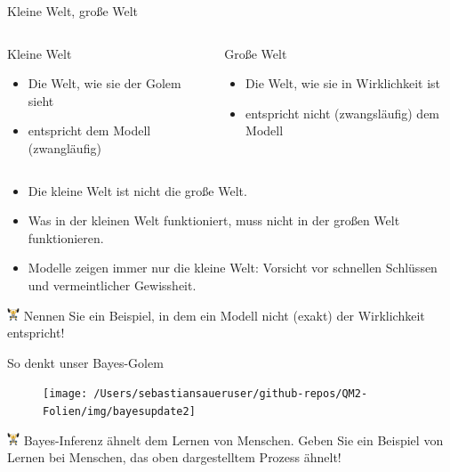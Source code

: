 \documentclass[
  ngerman,
  ignorenonframetext,
]{beamer}
\providecommand{\tightlist}{%
  \setlength{\itemsep}{0pt}\setlength{\parskip}{0pt}}
\begin{document}
\begin{frame}{Kleine Welt, große Welt}
\protect\hypertarget{kleine-welt-grouxdfe-welt-1}{}
\begin{columns}[T]
\begin{column}{0.5\textwidth}
\begin{block}{Kleine Welt}
\protect\hypertarget{kleine-welt}{}
\begin{itemize}
\tightlist
\item
  Die Welt, wie sie der Golem sieht
\item
  entspricht dem Modell (zwangläufig)
\end{itemize}
\end{block}
\end{column}

\begin{column}{0.5\textwidth}
\begin{block}{Große Welt}
\protect\hypertarget{grouxdfe-welt}{}
\begin{itemize}
\tightlist
\item
  Die Welt, wie sie in Wirklichkeit ist
\item
  entspricht nicht (zwangsläufig) dem Modell
\end{itemize}
\end{block}
\end{column}
\end{columns}

\begin{itemize}
\tightlist
\item
  Die kleine Welt ist nicht die große Welt.
\item
  Was in der kleinen Welt funktioniert, muss nicht in der großen Welt
  funktionieren.
\item
  Modelle zeigen immer nur die kleine Welt: Vorsicht vor schnellen
  Schlüssen und vermeintlicher Gewissheit.
\end{itemize}

\includegraphics[width=1em]{../img/weight.pdf} Nennen Sie ein Beispiel,
in dem ein Modell nicht (exakt) der Wirklichkeit entspricht!
\end{frame}

\begin{frame}{So denkt unser Bayes-Golem}
\protect\hypertarget{so-denkt-unser-bayes-golem}{}
\begin{figure}[H]
\texttt{[image: /Users/sebastiansaueruser/github-repos/QM2-Folien/img/bayesupdate2]} \end{figure}

\includegraphics[width=1em]{../img/weight.pdf} Bayes-Inferenz ähnelt dem
Lernen von Menschen. Geben Sie ein Beispiel von Lernen bei Menschen, das
oben dargestelltem Prozess ähnelt!
\end{frame}
\end{document}
